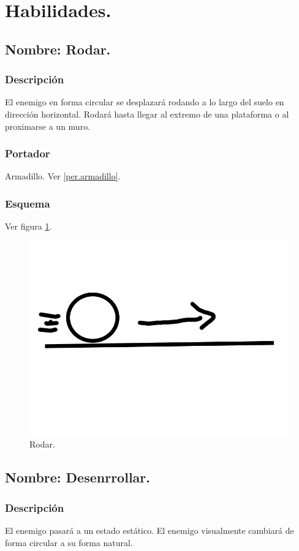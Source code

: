 \documentclass[11pt,letterpaper]{article}
\begin{document}
\section{Habilidades.}
	\subsection{Nombre: Rodar.} \label{hab.rodar}
		\subsubsection{Descripción}
		El enemigo en forma circular se desplazará rodando a lo largo del suelo en dirección horizontal.
		Rodará hasta llegar al extremo de una plataforma o al proximarse a un muro.
		\subsubsection{Portador}
		Armadillo. Ver \ref{per.armadillo}.
		\subsubsection{Esquema}
		Ver figura \ref{fig:rodar}.
		\begin{figure}
			\centering
			\includegraphics[height=0.2 \textheight]{Imagenes/rodar}
			\caption{Rodar.}
			\label{fig:rodar}
		\end{figure}
	\subsection{Nombre: Desenrrollar.} \label{hab.desenrrollar}
		\subsubsection{Descripción}
		El enemigo pasará a un estado estático. El enemigo visualmente cambiará de forma circular a su forma natural.
\end{document}
